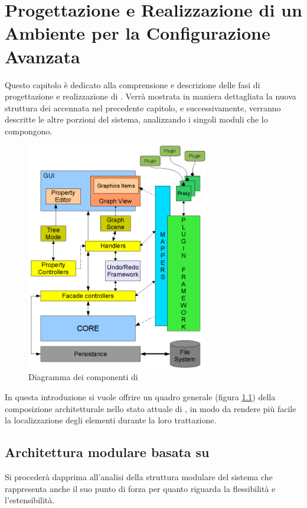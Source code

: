 \chapter{Progettazione e Realizzazione di un Ambiente per la Configurazione Avanzata}\label{capitolo:progettazione_realizzazione}
Questo capitolo è dedicato alla comprensione e descrizione delle fasi di progettazione e realizzazione di \visualnetkit{}. Verrà mostrata in maniera dettagliata la nuova struttura dei \plugin{} accennata nel precedente capitolo, e successivamente, verranno descritte le altre porzioni del sistema, analizzando i singoli moduli che lo compongono.

\begin{figure}[!htb]
	\centering
	\includegraphics[width=8cm]{images/diagramma_componenti_vnetkit.png}
	\caption{Diagramma dei componenti di \visualnetkit{}}
	\label{figura:vn_componenti}
\end{figure}

In questa introduzione si vuole offrire un quadro generale (figura \ref{figura:vn_componenti}) della composizione architetturale nello stato attuale di \visualnetkit{}, in modo da rendere più facile la localizzazione degli elementi durante la loro trattazione.

\section{Architettura modulare basata su \plugin{}}
Si procederà dapprima all'analisi della struttura modulare del sistema che rappresenta anche il suo punto di forza per quanto riguarda la flessibilità e l'estensibilità. 


